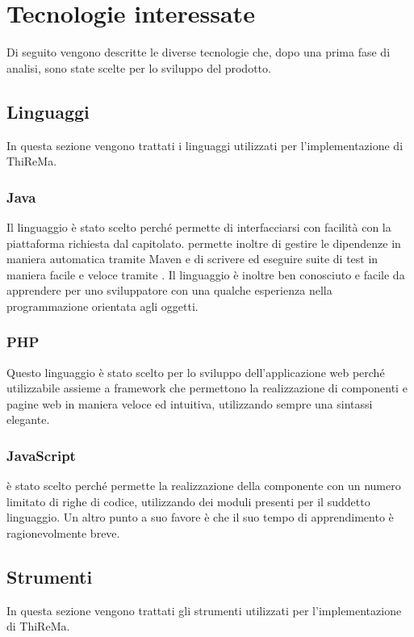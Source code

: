 \section{Tecnologie interessate}
	Di seguito vengono descritte le diverse tecnologie che, dopo una prima fase di analisi, sono state scelte per lo sviluppo del prodotto.
	\subsection{Linguaggi}
		In questa sezione vengono trattati i linguaggi utilizzati per l'implementazione di ThiReMa.
		\subsubsection{Java}
			Il linguaggio è stato scelto perché permette di interfacciarsi con facilità con la piattaforma  richiesta dal capitolato.  permette inoltre di gestire le dipendenze in maniera automatica tramite Maven e di scrivere ed eseguire suite di test in maniera facile e veloce tramite .
			\newline
			Il linguaggio è inoltre ben conosciuto e facile da apprendere per uno sviluppatore con una qualche esperienza nella programmazione orientata agli oggetti. 
		\subsubsection{PHP}
			Questo linguaggio è stato scelto per lo sviluppo dell'applicazione web perché utilizzabile assieme a framework che permettono la realizzazione di componenti e pagine web in maniera veloce ed intuitiva, utilizzando sempre una sintassi elegante.
		\subsubsection{JavaScript}
			 è stato scelto perché permette la realizzazione della componente  con un numero limitato di righe di codice, utilizzando dei moduli presenti per il suddetto linguaggio.
			\newline
			Un altro punto a suo favore è che il suo tempo di apprendimento è ragionevolmente breve.
	\subsection{Strumenti}
		In questa sezione vengono trattati gli strumenti utilizzati per l'implementazione di ThiReMa.

